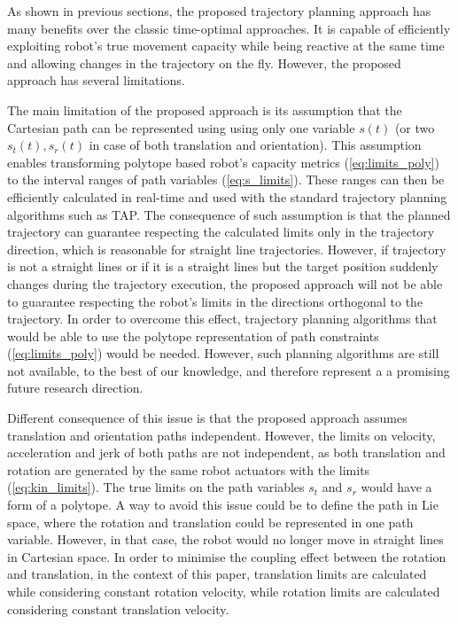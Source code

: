 As shown in previous sections, the proposed trajectory planning approach has many benefits over the classic time-optimal approaches. It is capable of efficiently exploiting robot's true movement capacity while being reactive at the same time and allowing changes in the trajectory on the fly. However, the proposed approach has several limitations.

The main limitation of the proposed approach is its assumption that the Cartesian path can be represented using using only one variable $s(t)$ (or two $s_t(t),s_r(t)$ in case of both translation and orientation). 
This assumption enables transforming polytope based robot's capacity metrics (\ref{eq:limits_poly}) to the interval ranges of path variables (\ref{eq:s_limits}). These ranges can then be efficiently calculated in real-time and used with the standard trajectory planning algorithms such as TAP.  
The consequence of such assumption is that the planned trajectory can guarantee respecting the calculated limits only in the trajectory direction, which is reasonable for straight line trajectories. However, if trajectory is not a straight lines or if it is a straight lines but the target position suddenly changes during the trajectory execution, the proposed approach will not be able to guarantee respecting the robot's limits in the directions orthogonal to the trajectory. In order to overcome this effect, trajectory planning algorithms that would be able to use the polytope representation of path constraints (\ref{eq:limits_poly}) would be needed. However, such planning algorithms are still not available, to the best of our knowledge, and therefore represent a a promising future research direction.

Different consequence of this issue is that the proposed approach assumes translation and orientation paths independent. However, the limits on velocity, acceleration and jerk of both paths are not independent, as both translation and rotation are generated by the same robot actuators with the limits (\ref{eq:kin_limits}). The true limits on the path variables $s_t$ and $s_r$ would have a form of a polytope. A way to avoid this issue could be to define the path in Lie space, where the rotation and translation could be represented in one path variable. However, in that case, the robot would no longer move in straight lines in Cartesian space. In order to minimise the coupling effect between the rotation and translation, in the context of this paper, translation limits are calculated while considering constant rotation velocity, while rotation limits are calculated considering constant translation velocity. 

